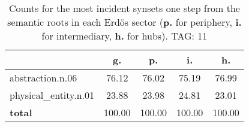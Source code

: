 \begin{table}[h!]
\begin{center}
\begin{tabular}{| l | c | c | c | c |}\hline
 & g. & p. & i. & h. \\\hline
abstraction.n.06 & 76.12  & 76.02  & 75.19  & 76.99 \\\hline
physical\_entity.n.01 & 23.88  & 23.98  & 24.81  & 23.01 \\\hline
{{\bf total}} & 100.00  & 100.00  & 100.00  & 100.00 \\\hline
\end{tabular}
\caption{Counts for the most incident synsets one step from the semantic roots in each Erd\"os sector ({\bf p.} for periphery, {\bf i.} for intermediary, {\bf h.} for hubs). TAG: 11}
\end{center}
\end{table}